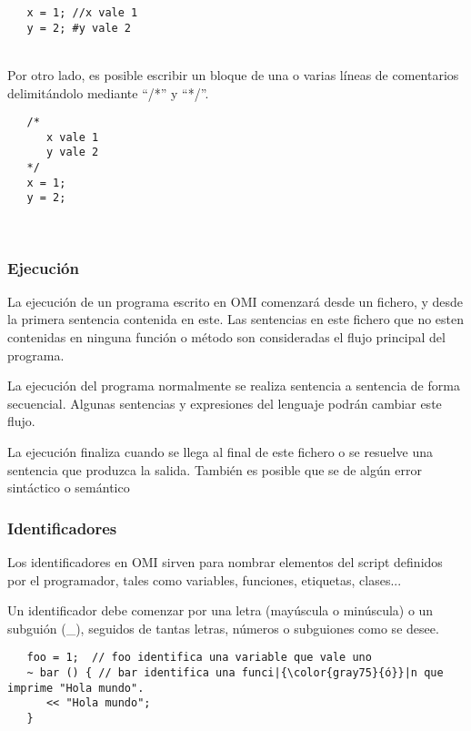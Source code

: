 \begin{lstlisting}
   x = 1; //x vale 1
   y = 2; #y vale 2
\end{lstlisting}
\hfill\\
 
Por otro lado, es posible escribir un bloque de una o varias líneas de comentarios delimitándolo mediante ``/*'' y ``*/''. \\

\begin{lstlisting}
   /* 
      x vale 1
      y vale 2
   */
   x = 1; 
   y = 2; 
\end{lstlisting}
\hfill\\

\subsubsection{Ejecución}\label{sec:execution}
La ejecución de un programa escrito en OMI comenzará desde un fichero, y desde la primera sentencia contenida en este. Las sentencias 
en este fichero que no esten contenidas en ninguna función o método son consideradas el flujo principal del programa.

La ejecución del programa normalmente se realiza sentencia a sentencia de forma secuencial. Algunas sentencias y expresiones del lenguaje podrán cambiar este flujo.

La ejecución finaliza cuando se llega al final de este fichero o se resuelve una sentencia que produzca la salida. También es posible que se de algún error sintáctico o semántico

\subsubsection{Identificadores}\label{sec:id}
Los identificadores en OMI sirven para nombrar elementos del script definidos por el programador,
tales como variables, funciones, etiquetas, clases...

Un identificador debe comenzar por una letra (mayúscula o minúscula) o un subguión (\_), seguidos de tantas letras, números o subguiones como se desee. \\

\begin{lstlisting}
   foo = 1;  // foo identifica una variable que vale uno
   ~ bar () { // bar identifica una funci|{\color{gray75}{ó}}|n que imprime "Hola mundo".
      << "Hola mundo";
   } 
\end{lstlisting}
\hfill\\

